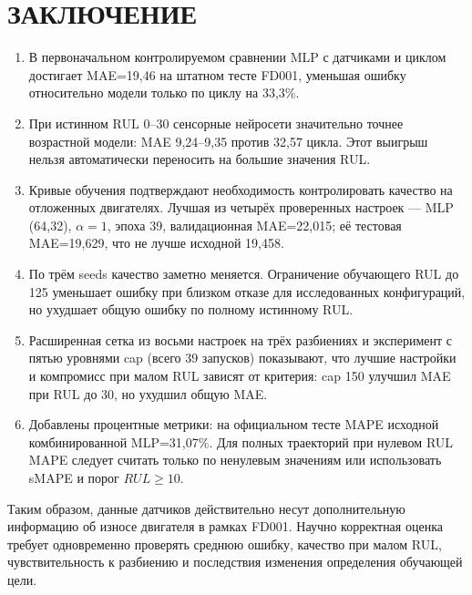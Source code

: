 \documentclass[12pt,a4paper]{article}
\begin{document}
\section*{ЗАКЛЮЧЕНИЕ}
\begin{enumerate}[leftmargin=1.3cm]
\item В первоначальном контролируемом сравнении MLP с датчиками и циклом достигает MAE=19,46 на штатном тесте FD001, уменьшая ошибку относительно модели только по циклу на 33,3\%.
\item При истинном RUL 0--30 сенсорные нейросети значительно точнее возрастной модели: MAE 9,24--9,35 против 32,57 цикла. Этот выигрыш нельзя автоматически переносить на большие значения RUL.
\item Кривые обучения подтверждают необходимость контролировать качество на отложенных двигателях. Лучшая из четырёх проверенных настроек — MLP (64,32), $\alpha=1$, эпоха 39, валидационная MAE=22,015; её тестовая MAE=19,629, что не лучше исходной 19,458.
\item По трём seeds качество заметно меняется. Ограничение обучающего RUL до 125 уменьшает ошибку при близком отказе для исследованных конфигураций, но ухудшает общую ошибку по полному истинному RUL.
\item Расширенная сетка из восьми настроек на трёх разбиениях и эксперимент с пятью уровнями cap (всего 39 запусков) показывают, что лучшие настройки и компромисс при малом RUL зависят от критерия: cap 150 улучшил MAE при RUL до 30, но ухудшил общую MAE.\item Добавлены процентные метрики: на официальном тесте MAPE исходной комбинированной MLP=31,07\%. Для полных траекторий при нулевом RUL MAPE следует считать только по ненулевым значениям или использовать sMAPE и порог $RUL\geq10$.
\end{enumerate}
Таким образом, данные датчиков действительно несут дополнительную информацию об износе двигателя в рамках FD001. Научно корректная оценка требует одновременно проверять среднюю ошибку, качество при малом RUL, чувствительность к разбиению и последствия изменения определения обучающей цели.
\end{document}
